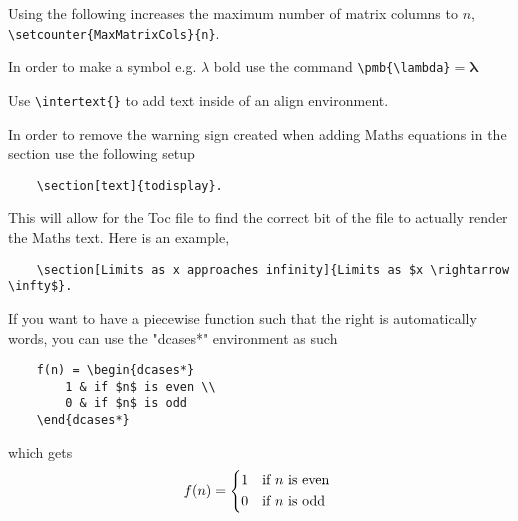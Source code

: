 \documentclass[10pt, a4paper]{article}
\begin{document}
Using the following increases the maximum number of matrix columns to $n$,
\verb|\setcounter{MaxMatrixCols}{n}|.

In order to make a symbol e.g. $\lambda$ bold use the command \verb|\pmb{\lambda}|$ = \pmb{\lambda}$

Use \verb|\intertext{}| to add text inside of an align environment.

In order to remove the warning sign created when adding Maths equations in the section use the following setup
\begin{verbatim}
    \section[text]{todisplay}.
\end{verbatim}
This will allow for the Toc file to find the correct bit of the file to actually render the Maths text.
Here is an example,
\begin{verbatim}
    \section[Limits as x approaches infinity]{Limits as $x \rightarrow \infty$}.
\end{verbatim}

If you want to have a piecewise function such that the right is automatically words,
you can use the "dcases*" environment as such
\begin{verbatim}
    f(n) = \begin{dcases*}
        1 & if $n$ is even \\
        0 & if $n$ is odd
    \end{dcases*}
\end{verbatim}
which gets
\[
f(n) = \begin{dcases*}
    1 & if $n$ is even \\
    0 & if $n$ is odd
\end{dcases*}
\]
\end{document}
